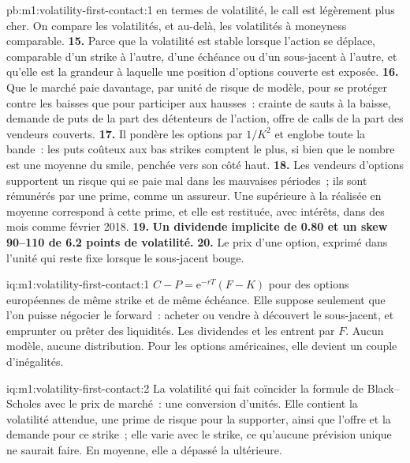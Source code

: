 \begin{solution}{pb:m1:volatility-first-contact:1}
en termes de volatilité, le call est légèrement plus cher. On compare les volatilités,
et au-delà, les volatilités à moneyness comparable.
\textbf{15.} Parce que la volatilité est stable lorsque l'action se déplace, comparable
d'un strike à l'autre, d'une échéance ou d'un sous-jacent à l'autre, et qu'elle est la grandeur
à laquelle une position d'options couverte est exposée.
\textbf{16.} Que le marché paie davantage, par unité de risque de modèle, pour
se protéger contre les baisses que pour participer aux hausses~: crainte de sauts
à la baisse, demande de puts de la part des détenteurs de l'action, offre de calls
de la part des vendeurs couverts.
\textbf{17.} Il pondère les options par $1/K^2$ et englobe toute la bande~: les
puts coûteux aux bas strikes comptent le plus, si bien que le nombre est une moyenne
du smile, penchée vers son côté haut.
\textbf{18.} Les vendeurs d'options supportent un risque qui se paie mal dans les mauvaises périodes~;
ils sont rémunérés par une prime, comme un assureur. Une  supérieure à la réalisée en
moyenne correspond à cette prime, et elle est restituée, avec intérêts, dans des mois comme
février 2018.
\textbf{19.} \textbf{Un dividende implicite de 0.80 et un skew 90--110 de 6.2
points de volatilité.}
\textbf{20.} Le prix d'une option, exprimé dans l'unité qui reste
fixe lorsque le sous-jacent bouge.
\end{solution}

\begin{solution}{iq:m1:volatility-first-contact:1}
$C - P = \mathrm{e}^{-rT}(F - K)$ pour des options européennes de même strike et de même
échéance. Elle suppose seulement que l'on puisse négocier le forward~: acheter ou vendre à
découvert le sous-jacent, et emprunter ou prêter des liquidités. Les dividendes et les  entrent par $F$. Aucun modèle, aucune distribution. Pour les options américaines, elle
devient un couple d'inégalités.
\end{solution}

\begin{solution}{iq:m1:volatility-first-contact:2}
La volatilité qui fait coïncider la formule de Black--Scholes avec le prix de marché~:
une conversion d'unités. Elle contient la volatilité attendue, une prime de risque
pour la supporter, ainsi que l'offre et la demande pour ce strike~; elle varie avec le strike,
ce qu'aucune prévision unique ne saurait faire. En moyenne, elle a dépassé la  ultérieure.
\end{solution}

